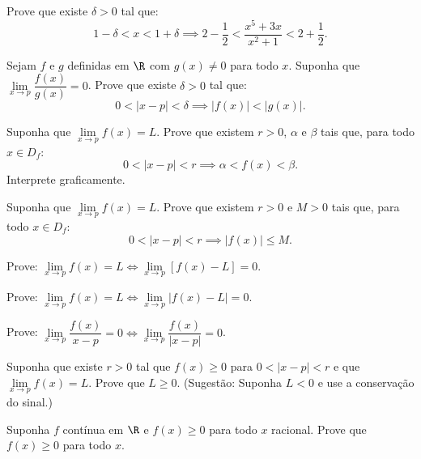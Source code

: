 \begin{exercicio}[7]
Prove que existe $\delta > 0$ tal que:
\[
1 - \delta < x < 1 + \delta \implies 2 - \dfrac{1}{2} < \dfrac{x^5 + 3x}{x^2 + 1} < 2 + \dfrac{1}{2}.
\]
\end{exercicio}

\begin{exercicio}[8]
Sejam $f$ e $g$ definidas em $\R$ com $g(x) \neq 0$ para todo $x$. Suponha que $\lim\limits_{x \to p} \dfrac{f(x)}{g(x)} = 0$. Prove que existe $\delta > 0$ tal que:
\[
0 < |x - p| < \delta \implies |f(x)| < |g(x)|.
\]
\end{exercicio}

\begin{exercicio}[9]
Suponha que $\lim\limits_{x \to p} f(x) = L$. Prove que existem $r > 0$, $\alpha$ e $\beta$ tais que, para todo $x \in D_f$:
\[
0 < |x - p| < r \implies \alpha < f(x) < \beta.
\]
Interprete graficamente.
\end{exercicio}

\begin{exercicio}[10]
Suponha que $\lim\limits_{x \to p} f(x) = L$. Prove que existem $r > 0$ e $M > 0$ tais que, para todo $x \in D_f$:
\[
0 < |x - p| < r \implies |f(x)| \le M.
\]
\end{exercicio}

\begin{exercicio}[11]
Prove: $\lim\limits_{x \to p} f(x) = L \iff \lim\limits_{x \to p} [f(x) - L] = 0$.
\end{exercicio}

\begin{exercicio}[12]
Prove: $\lim\limits_{x \to p} f(x) = L \iff \lim\limits_{x \to p} |f(x) - L| = 0$.
\end{exercicio}

\begin{exercicio}[13]
Prove: $\lim\limits_{x \to p} \dfrac{f(x)}{x - p} = 0 \iff \lim\limits_{x \to p} \dfrac{f(x)}{|x - p|} = 0$.
\end{exercicio}

\begin{exercicio}[14]
Suponha que existe $r > 0$ tal que $f(x) \ge 0$ para $0 < |x - p| < r$ e que $\lim\limits_{x \to p} f(x) = L$. Prove que $L \ge 0$. (Sugestão: Suponha $L < 0$ e use a conservação do sinal.)
\end{exercicio}

\begin{exercicio}[15]
Suponha $f$ contínua em $\R$ e $f(x) \ge 0$ para todo $x$ racional. Prove que $f(x) \ge 0$ para todo $x$.
\end{exercicio}

